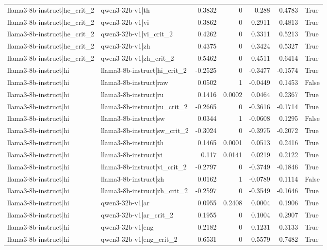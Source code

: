 \begin{table}
\begin{tabular}{l l r r r r l}
llama3-8b-instruct|he_crit_2 & qwen3-32b-v1|th & 0.3832 & 0 & 0.288 & 0.4783 & True \\
llama3-8b-instruct|he_crit_2 & qwen3-32b-v1|vi & 0.3862 & 0 & 0.2911 & 0.4813 & True \\
llama3-8b-instruct|he_crit_2 & qwen3-32b-v1|vi_crit_2 & 0.4262 & 0 & 0.3311 & 0.5213 & True \\
llama3-8b-instruct|he_crit_2 & qwen3-32b-v1|zh & 0.4375 & 0 & 0.3424 & 0.5327 & True \\
llama3-8b-instruct|he_crit_2 & qwen3-32b-v1|zh_crit_2 & 0.5462 & 0 & 0.4511 & 0.6414 & True \\
llama3-8b-instruct|hi & llama3-8b-instruct|hi_crit_2 & -0.2525 & 0 & -0.3477 & -0.1574 & True \\
llama3-8b-instruct|hi & llama3-8b-instruct|raw & 0.0502 & 1 & -0.0449 & 0.1453 & False \\
llama3-8b-instruct|hi & llama3-8b-instruct|ru & 0.1416 & 0.0002 & 0.0464 & 0.2367 & True \\
llama3-8b-instruct|hi & llama3-8b-instruct|ru_crit_2 & -0.2665 & 0 & -0.3616 & -0.1714 & True \\
llama3-8b-instruct|hi & llama3-8b-instruct|sw & 0.0344 & 1 & -0.0608 & 0.1295 & False \\
llama3-8b-instruct|hi & llama3-8b-instruct|sw_crit_2 & -0.3024 & 0 & -0.3975 & -0.2072 & True \\
llama3-8b-instruct|hi & llama3-8b-instruct|th & 0.1465 & 0.0001 & 0.0513 & 0.2416 & True \\
llama3-8b-instruct|hi & llama3-8b-instruct|vi & 0.117 & 0.0141 & 0.0219 & 0.2122 & True \\
llama3-8b-instruct|hi & llama3-8b-instruct|vi_crit_2 & -0.2797 & 0 & -0.3749 & -0.1846 & True \\
llama3-8b-instruct|hi & llama3-8b-instruct|zh & 0.0162 & 1 & -0.0789 & 0.1114 & False \\
llama3-8b-instruct|hi & llama3-8b-instruct|zh_crit_2 & -0.2597 & 0 & -0.3549 & -0.1646 & True \\
llama3-8b-instruct|hi & qwen3-32b-v1|ar & 0.0955 & 0.2408 & 0.0004 & 0.1906 & True \\
llama3-8b-instruct|hi & qwen3-32b-v1|ar_crit_2 & 0.1955 & 0 & 0.1004 & 0.2907 & True \\
llama3-8b-instruct|hi & qwen3-32b-v1|eng & 0.2182 & 0 & 0.1231 & 0.3133 & True \\
llama3-8b-instruct|hi & qwen3-32b-v1|eng_crit_2 & 0.6531 & 0 & 0.5579 & 0.7482 & True \\

\end{tabular}
\end{table}
